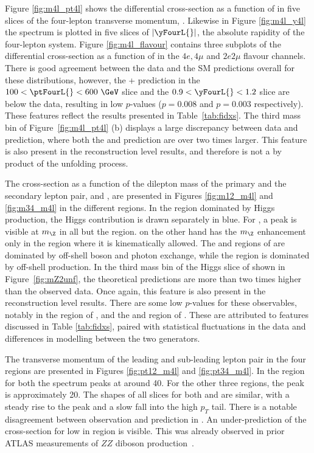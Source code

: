Figure \ref{fig:m4l_pt4l} shows the differential cross-section as a function of \mFourL{} in five slices of the four-lepton transverse momentum, \ptFourL{}. Likewise in Figure \ref{fig:m4l_y4l} the \mFourL{} spectrum is plotted in five slices of $|\yFourL{}|$, the absolute rapidity of the four-lepton system. Figure \ref{fig:m4l_flavour} contains three subplots of the differential cross-section as a function of \mFourL{} in the $4e, 4\mu$ and $2e2\mu$ flavour channels. There is good agreement between the data and the SM predictions overall for these distributions, however, the \POWHEG{}+\pythia{} prediction in the $100 < \ptFourL{} < 600~\GeV$ slice and the $0.9 < \yFourL{} < 1.2$ slice are below the data, resulting in low $p$-values ($p = 0.008$ and $p = 0.003$ respectively). These features reflect the results presented in Table~\ref{tab:fidxs}. The third mass bin of Figure~\ref{fig:m4l_pt4l} (b) displays a large discrepancy between data and prediction, where both the \SHERPA{} and \POWHEG{} prediction are over two times larger. This feature is also present in the reconstruction level results, and therefore is not a by product of the unfolding process.

The cross-section as a function of the dilepton mass of the primary and the secondary lepton pair, \mZOne{} and \mZTwo{}, are presented in Figures \ref{fig:m12_m4l} and \ref{fig:m34_m4l} in the different \mFourL{} regions. In the region dominated by Higgs production, the Higgs contribution is drawn separately in blue. For \mZOne{}, a peak is visible at $m_{\Z}$ in all but the \ZFourL{} region. \mZTwo{} on the other hand has the $m_{\Z}$ enhancement only in the \onshellZZ{} region where it is kinematically allowed. The \ZFourL{} and \offshellZZ{} regions of \mZTwo{} are dominated by off-shell \Z boson and photon exchange, while the \HFourL{} region is dominated by off-shell \Z production. In the third mass bin of the Higgs slice of \mZTwo{} shown in Figure~\ref{fig:mZ2unf}, the theoretical predictions are more than two times higher than the observed data. Once again, this feature is also present in the reconstruction level results. There are some low $p$-values for these observables, notably in the \onshellZZ{} region of \mZOne{}, and the \HFourL{} and \offshellZZ{} region of \mZTwo{}. These are attributed to features discussed in Table \ref{tab:fidxs}, paired with statistical fluctuations in the data and differences in modelling between the two generators. 

The transverse momentum of the leading and sub-leading lepton pair in the four \mFourL{} regions are presented in Figures \ref{fig:pt12_m4l} and \ref{fig:pt34_m4l}. In the \onshellZZ{} region for both the spectrum peaks at around \unit{40}{\GeV}. For the other three regions, the peak is approximately \unit{20}{\GeV}. The shapes of all slices for both \ptZOne{} and \ptZTwo{} are similar, with a steady rise to the peak and a slow fall into the high $p_T$ tail. There is a notable disagreement between observation and prediction in \ptZTwo{}. An under-prediction of the cross-section for low \pT in \onshellZZ{} region is visible. This was already observed in prior ATLAS measurements of $ZZ$ diboson production~\cite{Aaboud:97.032005}.

